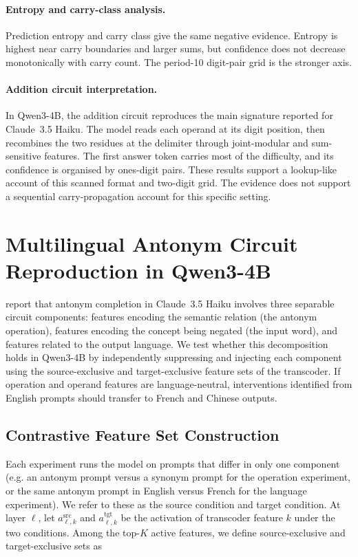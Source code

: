 \paragraph{Entropy and carry-class analysis.}
Prediction entropy and carry class give the same negative evidence.  Entropy is
highest near carry boundaries and larger sums, but confidence does not decrease
monotonically with carry count.  The period-10 digit-pair grid is the stronger
axis.

\paragraph{Addition circuit interpretation.}
In Qwen3-4B, the addition circuit reproduces the main signature reported for
Claude~3.5 Haiku.  The model reads each operand at its digit position, then recombines the two
residues at the delimiter through joint-modular and sum-sensitive features.  The first answer token carries most of the difficulty,
and its confidence is organised by ones-digit pairs.  These results support a
lookup-like account of this scanned  format and two-digit
grid.  The evidence does not support a sequential carry-propagation account for
this specific setting.

\clearpage

\section{Multilingual Antonym Circuit Reproduction in Qwen3-4B}

\citet{lindsey2025biology} report that antonym completion in Claude~3.5 Haiku
involves three separable circuit components: features encoding the semantic relation
(the antonym operation), features encoding the concept being negated (the input word),
and features related to the output language.
We test whether this decomposition holds in Qwen3-4B by independently suppressing
and injecting each component using the source-exclusive and target-exclusive
feature sets of the transcoder.
If operation and operand features are language-neutral, interventions identified from
English prompts should transfer to French and Chinese outputs.

\subsection{Contrastive Feature Set Construction}
\label{subsec:exclusive-features}

Each experiment runs the model on prompts that differ in only one
component (e.g. an antonym prompt versus a synonym prompt for the
operation experiment, or the same antonym prompt in English versus French for the
language experiment).  We refer to these as the source condition and target condition.
At layer $\ell$, let $a_{\ell,k}^{\mathrm{src}}$ and
$a_{\ell,k}^{\mathrm{tgt}}$ be the activation of transcoder feature $k$ under
the two conditions.  Among the top-$K$ active features, we define
source-exclusive and target-exclusive sets as

